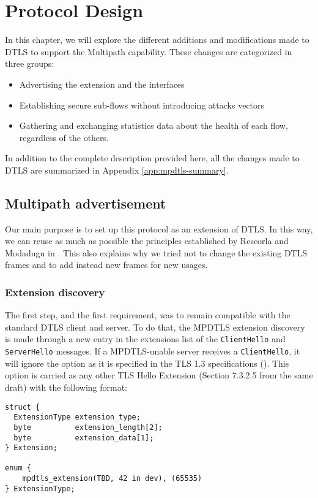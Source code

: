 \chapter{Protocol Design}\label{chap:design}

In this chapter, we will explore the different additions and modifications made to DTLS to support the Multipath capability. These changes are categorized in three groups:
\begin{itemize}
\item Advertising the extension and the interfaces
\item Establishing secure sub-flows without introducing attacks vectors
\item Gathering and exchanging statistics data about the health of each flow, regardless of the others. 
\end{itemize}

In addition to the complete description provided here, all the changes made to DTLS are summarized in Appendix \ref{app:mpdtls-summary}.


\section{Multipath advertisement}

Our main purpose is to set up this protocol as an extension of DTLS. In this way, we can reuse as much as possible the principles established by Rescorla and Modadugu in \cite{modadugu2004design}. This also explains why we tried not to change the existing DTLS frames and to add instead new frames for new usages.

\subsection{Extension discovery}\label{sec:helloext}

The first step, and the first requirement, was to remain compatible with the standard DTLS client and server. To do that, the MPDTLS extension discovery is made through a new entry in the extensions list of the \texttt{ClientHello} and \texttt{ServerHello} messages. If a MPDTLS-unable server receives a \texttt{ClientHello}, it will ignore the option as it is specified in the TLS 1.3 specifications (\cite{draft-tls13}). This option is carried as any other TLS Hello Extension (Section 7.3.2.5 from the same draft) with the following format:

\begin{lstlisting}[caption=MultiPath DTLS Extension structure, label=lst:extension]
struct {
  ExtensionType extension_type;
  byte          extension_length[2];
  byte          extension_data[1];
} Extension;

enum {
    mpdtls_extension(TBD, 42 in dev), (65535)
} ExtensionType;
\end{lstlisting}

